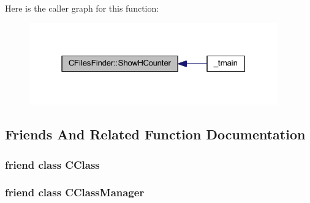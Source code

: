 Here is the caller graph for this function\+:
\nopagebreak
\begin{figure}[H]
\begin{center}
\leavevmode
\includegraphics[width=304pt]{class_c_files_finder_a0aee1050295a066330dc0f2974089006_icgraph}
\end{center}
\end{figure}




\subsection{Friends And Related Function Documentation}
\hypertarget{class_c_files_finder_ae2f76f286ff7f2c3836026f880f0438e}{
\subsubsection[{C\+Class}]{\setlength{\rightskip}{0pt plus 5cm}friend class {\bf C\+Class}\hspace{0.3cm}{\ttfamily [friend]}}}\label{class_c_files_finder_ae2f76f286ff7f2c3836026f880f0438e}
\hypertarget{class_c_files_finder_a160d67be17e37e9f9a8ca10aa20e8ff1}{
\subsubsection[{C\+Class\+Manager}]{\setlength{\rightskip}{0pt plus 5cm}friend class {\bf C\+Class\+Manager}\hspace{0.3cm}{\ttfamily [friend]}}}\label{class_c_files_finder_a160d67be17e37e9f9a8ca10aa20e8ff1}


